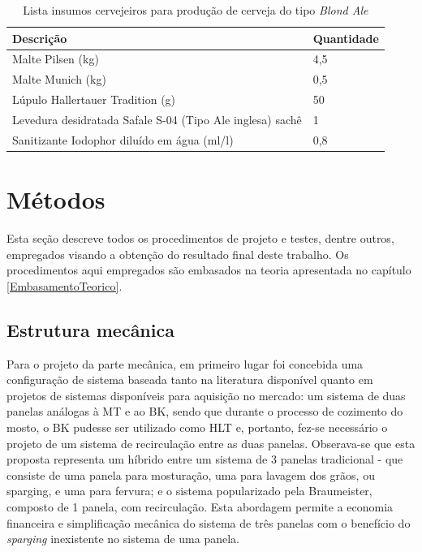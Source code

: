 \begin{center}
	\begin{table}[H]
		\captionsetup{justification=centering}
		\caption[Lista insumos cervejeiros para produção de cerveja do tipo \textit{Blond Ale}]{Lista insumos cervejeiros para produção de cerveja do tipo \textit{Blond Ale}}
		\label{bom_recipe}
		\begin{tabular}{ | M{13cm} | M{2cm} |}
			\hline
			\textbf{Descrição} & \textbf{Quantidade} \\ \hline
			Malte Pilsen (kg) & 4,5\\ \hline
			Malte Munich (kg) & 0,5\\ \hline
			Lúpulo Hallertauer Tradition (g) & 50\\ \hline
			Levedura desidratada Safale S-04 (Tipo Ale inglesa) sachê & 1\\ \hline
			Sanitizante Iodophor diluído em água (ml/l) & 0,8\\ \hline
		\end{tabular}
	\end{table}
\end{center}

\section{Métodos}

Esta seção descreve todos os procedimentos de projeto e testes, dentre outros,  empregados visando a obtenção do resultado final deste trabalho. Os procedimentos aqui empregados são embasados na teoria apresentada no capítulo \ref{EmbasamentoTeorico}.


\subsection{Estrutura mecânica}

Para o projeto da parte mecânica, em primeiro lugar foi concebida uma configuração de sistema baseada tanto na literatura disponível quanto em projetos de sistemas disponíveis para aquisição no mercado: um sistema de duas panelas análogas à MT e ao BK, sendo que durante o processo de cozimento do mosto, o BK pudesse ser utilizado como HLT e, portanto, fez-se necessário o projeto de um sistema de recirculação entre as duas panelas. Obserava-se que esta proposta representa um híbrido entre um sistema de 3 panelas tradicional - que consiste de uma panela para mosturação, uma para lavagem dos grãos, ou sparging, e uma para fervura; e o sistema popularizado pela Braumeister, composto de 1 panela, com recirculação. Esta abordagem permite a economia financeira e simplificação mecânica do sistema de três panelas com o benefício do \textit{sparging} inexistente no sistema de uma panela.

